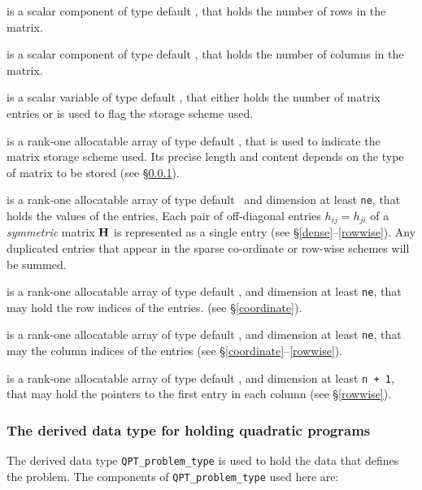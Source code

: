 \documentclass{galahad}
\begin{document}
\begin{description}

 is a scalar component of type default \integer,
that holds the number of rows in the matrix.

 is a scalar component of type default \integer,
that holds the number of columns in the matrix.

 is a scalar variable of type default \integer, that either
holds the number of matrix entries or is used to flag the storage scheme
used.

 is a rank-one allocatable array of type default \character, that
is used to indicate the matrix storage scheme used. Its precise length and
content depends on the type of matrix to be stored (see \S\ref{typeqp}).

 is a rank-one allocatable array of type default \realdp\,
and dimension at least {\tt ne}, that holds the values of the entries.
Each pair of off-diagonal entries $h_{ij} = h_{ji}$ of a {\em symmetric}
matrix ${\mathbf{H}}$ is represented as a single entry
(see \S\ref{dense}--\ref{rowwise}).
Any duplicated entries that appear in the sparse
co-ordinate or row-wise schemes will be summed.

 is a rank-one allocatable array of type default \integer,
and dimension at least {\tt ne}, that may hold the row indices of the entries.
(see \S\ref{coordinate}).

 is a rank-one allocatable array of type default \integer,
and dimension at least {\tt ne}, that may the column indices of the entries
(see \S\ref{coordinate}--\ref{rowwise}).

 is a rank-one allocatable array of type default \integer,
and dimension at least {\tt n + 1}, that may hold the pointers to
the first entry in each column (see \S\ref{rowwise}).

\end{description}


\subsubsection{The derived data type for holding quadratic programs}
\label{typeqp}

The derived data type
{\tt QPT\_problem\_type}
is used to hold the data that defines the problem.
The components of
{\tt QPT\_problem\_type} used here are:
\end{document}
